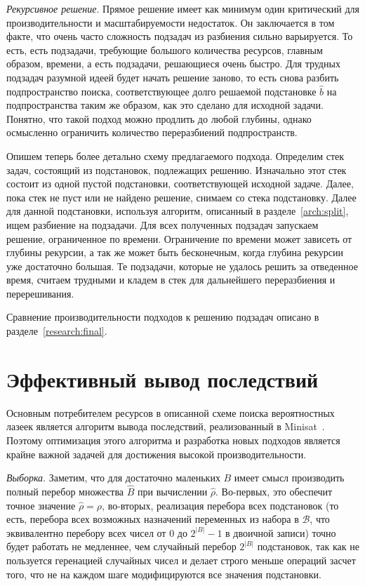 \textit{Рекурсивное решение}. Прямое решение имеет как минимум один критический для производительности
и масштабируемости недостаток. Он заключается в том факте, что очень часто сложность подзадач из
разбиения сильно варьируется. То есть, есть подзадачи, требующие большого количества ресурсов, главным
образом, времени, а есть подзадачи, решающиеся очень быстро. Для трудных подзадач разумной идеей
будет начать решение заново, то есть снова разбить подпространство поиска, соответствующее долго
решаемой подстановке $\hat{b}$ на подпространства таким же образом, как это сделано для исходной
задачи. Понятно, что такой подход можно продлить до любой глубины, однако осмысленно ограничить
количество переразбиений подпространств.

Опишем теперь более детально схему предлагаемого подхода. Определим стек задач, состоящий из
подстановок, подлежащих решению. Изначально этот стек состоит из одной пустой подстановки,
соответствующей исходной задаче. Далее, пока стек не пуст или не найдено решение, снимаем со стека
подстановку. Далее для данной подстановки, используя алгоритм, описанный в разделе~\ref{arch:split},
ищем разбиение на подзадачи. Для всех полученных подзадач запускаем решение, ограниченное по
времени. Ограничение по времени может зависеть от глубины рекурсии, а так же может быть бесконечным,
когда глубина рекурсии уже достаточно большая. Те подзадачи, которые не удалось решить за 
отведенное время, считаем трудными и кладем в стек для дальнейшего переразбиения и перерешивания.

Сравнение производительности подходов к решению подзадач описано в разделе~\ref{research:final}.

\section{Эффективный вывод последствий}\label{arch:rbs:prop}

Основным потребителем ресурсов в описанной схеме поиска вероятностных лазеек является алгоритм
вывода последствий, реализованный в Minisat~\cite{bib:minisat}. Поэтому оптимизация этого алгоритма
и разработка новых подходов является крайне важной задачей для достижения высокой производительности.

\textit{Выборка}\label{arch:rbs:prop:sampling}. Заметим, что для достаточно маленьких $B$ имеет
смысл производить полный перебор множества $\hat{B}$ при вычислении $\hat{\rho}$. Во-первых,
это обеспечит точное значение $\hat{\rho} = \rho$, во-вторых, реализация перебора всех подстановок
(то есть, перебора всех возможных назначений переменных из набора в $\mathcal{B}$, что эквивалентно
перебору всех чисел от $0$ до $2^{|B|} - 1$ в двоичной записи) точно будет работать не медленнее,
чем случайный перебор $2^{|B|}$ подстановок, так как не пользуется геренацией случайных чисел и
делает строго меньше операций засчет того, что не на каждом шаге модифицируются все значения подстановки.

